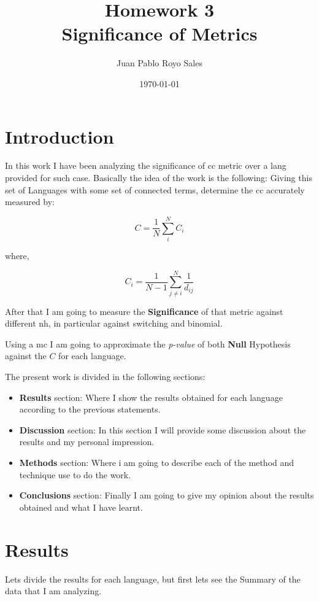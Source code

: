 \documentclass[12pt, a4paper]{article}
\title{%
      Homework 3\\
      Significance of Metrics\\
}
\author{Juan Pablo Royo Sales}
\affil{Universitat Politècnica de Catalunya}
\date\today
\begin{document}
\maketitle

\tableofcontents

\section{Introduction}
In this work I have been analyzing the significance of \acrfull{cc} metric over a \acrfull{lang} provided for such case.
Basically the idea of the work is the following: Giving this set of Languages with some set of connected terms, determine 
the \acrshort{cc} accurately measured by:

\begin{equation}
    C = \frac{1}{N} \sum_{i}^N C_i
\end{equation}

where,

\begin{equation}
    C_i = \frac{1}{N-1} \sum_{j \neq i}^N \frac{1}{d_{ij}}
\end{equation}


After that I am going to measure the \textbf{Significance} of that metric against different \acrshort{nh}, in particular against \acrfull{switching} and \acrfull{binomial}.

Using a \acrfull{mc} I am going to approximate the \textit{p-value} of both \textbf{Null} Hypothesis against the $C$ for each language.

The present work is divided in the following sections:

\begin{itemize}
    \item \textbf{Results} section: Where I show the results obtained for each language according to the previous statements.
    \item \textbf{Discussion} section: In this section I will provide some discussion about the results and my personal impression.
    \item \textbf{Methods} section: Where i am going to describe each of the method and technique use to do the work.
    \item \textbf{Conclusions} section: Finally I am going to give my opinion about the results obtained and what I have learnt.
\end{itemize}

\section{Results}
Lets divide the results for each language, but first lets see the Summary of the data that I am analyzing.
\end{document}
